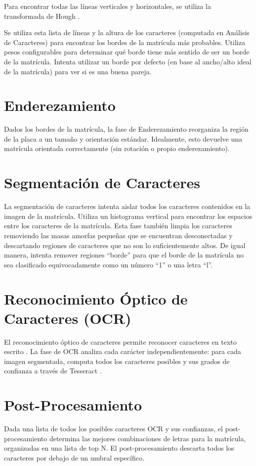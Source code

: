Para encontrar todas las líneas verticales y horizontales, se utiliza la transformada de Hough \cite{OpenCV2016-kr}.

Se utiliza esta lista de líneas y la altura de los caracteres (computada en Análisis de Caracteres) para encontrar los bordes de la matrícula más probables. Utiliza pesos configurables para determinar qué borde tiene más sentido de ser un borde de la matrícula. Intenta utilizar un borde por defecto (en base al ancho/alto ideal de la matrícula) para ver si es una buena pareja.

\section{Enderezamiento}
Dados los bordes de la matrícula, la fase de Enderezamiento reorganiza la región de la placa a un tamaño y orientación estándar. Idealmente, esto devuelve una matrícula orientada correctamente (sin rotación o propio enderezamiento).

\section{Segmentación de Caracteres}
La segmentación de caracteres intenta aislar todos los caracteres contenidos en la imagen de la matrícula. Utiliza un histograma vertical para encontrar los espacios entre los caracteres de la matrícula. Esta fase también limpia los caracteres removiendo las masas amorfas pequeñas que se encuentran desconectadas y descartando regiones de caracteres que no son lo suficientemente altos. De igual manera, intenta remover regiones “borde” para que el borde de la matrícula no sea clasificado equivocadamente como un número “1” o una letra “l”. 

\section{Reconocimiento Óptico de Caracteres (OCR)}
El reconocimiento óptico de caracteres permite reconocer caracteres en texto escrito \cite{Mithe2013-yn}. La fase de OCR analiza cada carácter independientemente: para cada imagen segmentada, computa todos los caracteres posibles  y sus grados de confianza a través de Tesseract \cite{Tesseract-OCR2016-fe}.
\section{Post-Procesamiento}
Dada una lista de todos los posibles caracteres OCR y sus confianzas, el post-procesamiento determina las mejores combinaciones de letras para la matrícula, organizadas en una lista de top N. El post-procesamiento descarta todos los caracteres por debajo de un umbral específico. 

